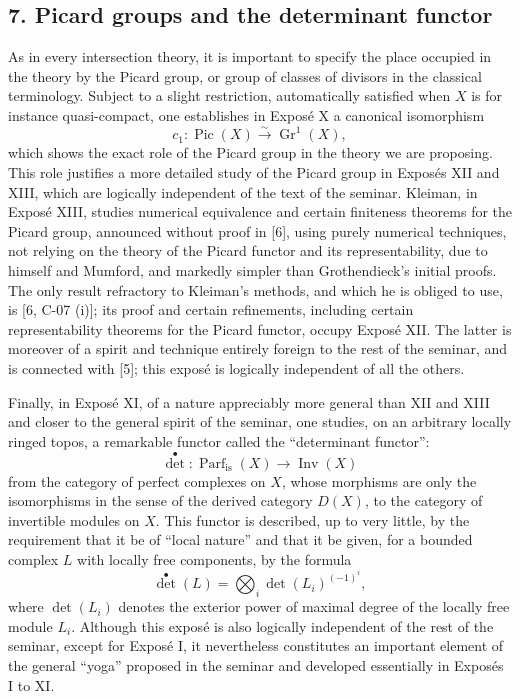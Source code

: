 \documentclass[11pt]{article}
\newcommand{\Gr}{\operatorname{Gr}}
\newcommand{\Parf}{\operatorname{Parf}}
\providecommand{\Inv}{\operatorname{Inv}}
\providecommand{\Pic}{\operatorname{Pic}}
\begin{document}
\subsection*{7. Picard groups and the determinant functor}
As in every intersection theory, it is important to specify the place occupied in the theory by the Picard group, or group of classes of divisors in the classical terminology. Subject to a slight restriction, automatically satisfied when $X$ is for instance quasi-compact, one establishes in Expos\'e X a canonical isomorphism
\begin{equation}\tag{7.1}
c_1:\Pic(X)\xrightarrow{\sim}\Gr^1(X),
\end{equation}
which shows the exact role of the Picard group in the theory we are proposing. This role justifies a more detailed study of the Picard group in Expos\'es XII and XIII, which are logically independent of the text of the seminar. Kleiman, in Expos\'e XIII, studies numerical equivalence and certain finiteness theorems for the Picard group, announced without proof in [6], using purely numerical techniques, not relying on the theory of the Picard functor and its representability, due to himself and Mumford, and markedly simpler than Grothendieck's initial proofs. The only result refractory to Kleiman's methods, and which he is obliged to use, is [6, C-07 (i)]; its proof and certain refinements, including certain representability theorems for the Picard functor, occupy Expos\'e XII. The latter is moreover of a spirit and technique entirely foreign to the rest of the seminar, and is connected with [5]; this expos\'e is logically independent of all the others.

Finally, in Expos\'e XI, of a nature appreciably more general than XII and XIII and closer to the general spirit of the seminar, one studies, on an arbitrary locally ringed topos, a remarkable functor called the ``determinant functor'':
\begin{equation}\tag{7.2}
\det^\bullet:\Parf_{\mathrm{is}}(X)\longrightarrow \Inv(X)
\end{equation}
from the category of perfect complexes on $X$, whose morphisms are only the isomorphisms in the sense of the derived category $D(X)$, to the category of invertible modules on $X$. This functor is described, up to very little, by the requirement that it be of ``local nature'' and that it be given, for a bounded complex $L$ with locally free components, by the formula
\begin{equation}\tag{7.3}
\det^\bullet(L)=\bigotimes_i \det(L_i)^{(-1)^i},
\end{equation}
where $\det(L_i)$ denotes the exterior power of maximal degree of the locally free module $L_i$. Although this expos\'e is also logically independent of the rest of the seminar, except for Expos\'e I, it nevertheless constitutes an important element of the general ``yoga'' proposed in the seminar and developed essentially in Expos\'es I to XI.
\end{document}
